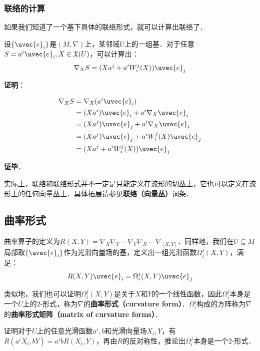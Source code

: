 \subsubsection{联络的计算}

如果我们知道了一个基下具体的联络形式，就可以计算出联络了．

\begin{theorem}{}
设$\{\uvec{e}_i\}$是$(M, \nabla)$上，某邻域$U$上的一组基．对于任意$S=a^i\uvec{e}_i, X\in\mathfrak{X}(U)$，可以计算出：
\begin{equation}
\nabla_XS=(Xa^j+a^iW^j_i(X))\uvec{e}_j
\end{equation}
\end{theorem}

\textbf{证明}：

\begin{equation}
\begin{aligned}
\nabla_XS&=\nabla_X(a^i\uvec{e}_i)\\
&=(Xa^i)\uvec{e}_i+a^i\nabla_X\uvec{e}_i\\
&=(Xa^j)\uvec{e}_j+a^i\nabla_X\uvec{e}_i\\
&=(Xa^j)\uvec{e}_j+a^iW^j_i(X)\uvec{e}_j\\
&=(Xa^j+a^iW^j_i(X))\uvec{e}_j
\end{aligned}
\end{equation}

\textbf{证毕}．

实际上，联络和联络形式并不一定是只能定义在流形的切丛上，它也可以定义在流形上的任何向量丛上．具体拓展请参见\textbf{联络（向量丛）}词条．

\subsection{曲率形式}

曲率算子的定义为$R(X, Y)=\nabla_X\nabla_Y-\nabla_Y\nabla_X-\nabla_{[X, Y]}$．同样地，我们在$U\subseteq M$局部取$\{\uvec{e}_i\}$作为光滑向量场的基，定义出一组光滑函数$\Omega^j_i(X, Y)$，满足：
\begin{equation}
R(X, Y)\uvec{e}_i=\Omega^j_i(X, Y)\uvec{e}_j
\end{equation}

类似地，我们也可以证明$\Omega^j_i(X, Y)$是关于$X$和$Y$的一个线性函数，因此$\Omega^j_i$本身是一个$U$上的$2$-形式，称为$\nabla$的\textbf{曲率形式（curvature form）}．$\Omega^j_i$构成的方阵称为$\nabla$的\textbf{曲率形式矩阵（matrix of curvature forms）}．

\begin{exercise}{}
证明对于$U$上的任意光滑函数$a^i, b$和光滑向量场$X_i, Y$，有$R(a^iX_i, bY)=a^ibR(X_i, Y)$，再由$R$的反对称性，推论出$\Omega^j_i$本身是一个$2$-形式．
\end{exercise}




